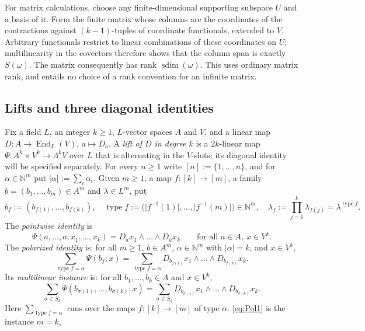 \documentclass[11pt]{amsart}
\theoremstyle{definition}
\theoremstyle{remark}
\numberwithin{equation}{section}
\newcommand{\N}{\mathbb N}
\newcommand{\End}{\operatorname{End}}
\newcommand{\abs}[1]{\lvert #1\rvert}
\newcommand{\type}{\operatorname{type}}
\newcommand{\sdim}{\operatorname{sdim}}
\begin{document}
For matrix calculations, choose any finite-dimensional supporting
subspace $U$ and a basis of it. Form the finite matrix whose columns
are the coordinates of the contractions against $(k-1)$\nobreakdash-tuples
of coordinate functionals, extended to $V$. Arbitrary functionals
restrict to linear combinations of these coordinates on $U$;
multilinearity in the covectors therefore shows that the column span
is exactly $S(\omega)$. The matrix consequently has rank
$\sdim(\omega)$. This uses ordinary matrix rank, and entails no
choice of a rank convention for an infinite matrix.

\subsection{Lifts and three diagonal identities}\label{ssec:diag}
Fix a field $L$, an integer $k\ge1$, $L$\nobreakdash-vector spaces $A$ and $V$, and a linear map $D\colon A\to\End_L(V)$,
$a\mapsto D_a$. A \emph{lift of $D$ in degree $k$} is a $2k$\nobreakdash-linear map $\Psi\colon A^k\times V^k\to\Lambda^kV$ over $L$ that is
alternating in the $V$\nobreakdash-slots; its diagonal identity will be specified separately. For every $n\ge1$ write
$[n]:=\{1,\dots,n\}$, and for $\alpha\in\N^m$ put $\abs\alpha:=\sum_i\alpha_i$. Given $m\ge1$, a map
$f\colon[k]\to[m]$, a family $b=(b_1,\dots,b_m)\in A^m$ and $\lambda\in L^m$, put
\[
b_f:=(b_{f(1)},\dots,b_{f(k)}),\quad \type f:=\bigl(\abs{f^{-1}(1)},\dots,\abs{f^{-1}(m)}\bigr)\in\N^m,\quad
\lambda_f:=\prod_{j=1}^k\lambda_{f(j)}=\lambda^{\type f}.
\]
The \emph{pointwise identity} is
\begin{equation*}\tag{Pw}\label{eq:Pw}
\Psi(a,\dots,a;x_1,\dots,x_k)=D_ax_1\wedge\dots\wedge D_ax_k\qquad\text{for all }a\in A,\ x\in V^k.
\end{equation*}
The \emph{polarized identity} is: for all $m\ge1$, $b\in A^m$, $\alpha\in\N^m$ with $\abs\alpha=k$, and $x\in V^k$,
\begin{equation*}\tag{Pol}\label{eq:Pol}
\sum_{\type f=\alpha}\Psi(b_f;x)=\sum_{\type f=\alpha}D_{b_{f(1)}}x_1\wedge\dots\wedge D_{b_{f(k)}}x_k .
\end{equation*}
Its \emph{multilinear instance} is: for all $b_1,\dots,b_k\in A$ and $x\in V^k$,
\begin{equation*}\tag{Pol1}\label{eq:Pol1}
\sum_{\sigma\in S_k}\Psi(b_{\sigma(1)},\dots,b_{\sigma(k)};x)
=\sum_{\sigma\in S_k}D_{b_{\sigma(1)}}x_1\wedge\dots\wedge D_{b_{\sigma(k)}}x_k .
\end{equation*}
Here $\sum_{\type f=\alpha}$ runs over the maps $f\colon[k]\to[m]$ of type $\alpha$. \eqref{eq:Pol1} is the instance $m=k$,
\end{document}
